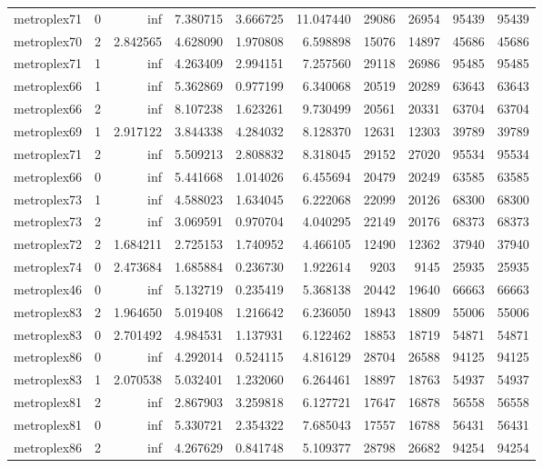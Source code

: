 \begin{longtable}{|l|r|r|r|r|r|r|r|r|r|}
metroplex71 & 0 & inf & 7.380715 & 3.666725 & 11.047440 & 29086 & 26954 & 95439 & 95439 \\
metroplex70 & 2 & 2.842565 & 4.628090 & 1.970808 & 6.598898 & 15076 & 14897 & 45686 & 45686 \\
metroplex71 & 1 & inf & 4.263409 & 2.994151 & 7.257560 & 29118 & 26986 & 95485 & 95485 \\
metroplex66 & 1 & inf & 5.362869 & 0.977199 & 6.340068 & 20519 & 20289 & 63643 & 63643 \\
metroplex66 & 2 & inf & 8.107238 & 1.623261 & 9.730499 & 20561 & 20331 & 63704 & 63704 \\
metroplex69 & 1 & 2.917122 & 3.844338 & 4.284032 & 8.128370 & 12631 & 12303 & 39789 & 39789 \\
metroplex71 & 2 & inf & 5.509213 & 2.808832 & 8.318045 & 29152 & 27020 & 95534 & 95534 \\
metroplex66 & 0 & inf & 5.441668 & 1.014026 & 6.455694 & 20479 & 20249 & 63585 & 63585 \\
metroplex73 & 1 & inf & 4.588023 & 1.634045 & 6.222068 & 22099 & 20126 & 68300 & 68300 \\
metroplex73 & 2 & inf & 3.069591 & 0.970704 & 4.040295 & 22149 & 20176 & 68373 & 68373 \\
metroplex72 & 2 & 1.684211 & 2.725153 & 1.740952 & 4.466105 & 12490 & 12362 & 37940 & 37940 \\
metroplex74 & 0 & 2.473684 & 1.685884 & 0.236730 & 1.922614 & 9203 & 9145 & 25935 & 25935 \\
metroplex46 & 0 & inf & 5.132719 & 0.235419 & 5.368138 & 20442 & 19640 & 66663 & 66663 \\
metroplex83 & 2 & 1.964650 & 5.019408 & 1.216642 & 6.236050 & 18943 & 18809 & 55006 & 55006 \\
metroplex83 & 0 & 2.701492 & 4.984531 & 1.137931 & 6.122462 & 18853 & 18719 & 54871 & 54871 \\
metroplex86 & 0 & inf & 4.292014 & 0.524115 & 4.816129 & 28704 & 26588 & 94125 & 94125 \\
metroplex83 & 1 & 2.070538 & 5.032401 & 1.232060 & 6.264461 & 18897 & 18763 & 54937 & 54937 \\
metroplex81 & 2 & inf & 2.867903 & 3.259818 & 6.127721 & 17647 & 16878 & 56558 & 56558 \\
metroplex81 & 0 & inf & 5.330721 & 2.354322 & 7.685043 & 17557 & 16788 & 56431 & 56431 \\
metroplex86 & 2 & inf & 4.267629 & 0.841748 & 5.109377 & 28798 & 26682 & 94254 & 94254 \\

\end{longtable}
